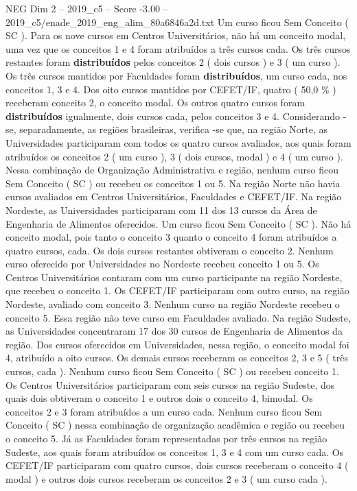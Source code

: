 \begin{textsample}{NEG Dim 2 – 2019\_c5 – Score -3.00 – 2019\_c5/enade\_2019\_eng\_alim\_80a6846a2d.txt}
Um curso ficou Sem Conceito ( SC ).
Para os nove cursos em Centros Universitários, não há um conceito modal, uma vez que os conceitos 1 e 4 foram atribuídos a três cursos cada.
Os três cursos restantes foram \textbf{distribuídos} pelos conceitos 2 ( dois cursos ) e 3 ( um curso ).
Os três cursos mantidos por Faculdades foram \textbf{distribuídos}, um curso cada, nos conceitos 1, 3 e 4.
Dos oito cursos mantidos por CEFET/IF, quatro ( 50,0 \% ) receberam conceito 2, o conceito modal.
Os outros quatro cursos foram \textbf{distribuídos} igualmente, dois cursos cada, pelos conceitos 3 e 4.
Considerando -se, separadamente, as regiões brasileiras, verifica -se que, na região Norte, as Universidades participaram com todos os quatro cursos avaliados, aos quais foram atribuídos os conceitos 2 ( um curso ), 3 ( dois cursos, modal ) e 4 ( um curso ).
Nessa combinação de Organização Administrativa e região, nenhum curso ficou Sem Conceito ( SC ) ou recebeu os conceitos 1 ou 5.
Na região Norte não havia cursos avaliados em Centros Universitários, Faculdades e CEFET/IF.
Na região Nordeste, as Universidades participaram com 11 dos 13 cursos da Área de Engenharia de Alimentos oferecidos.
Um curso ficou Sem Conceito ( SC ).
Não há conceito modal, pois tanto o conceito 3 quanto o conceito 4 foram atribuídos a quatro cursos, cada.
Os dois cursos restantes obtiveram o conceito 2.
Nenhum curso oferecido por Universidades no Nordeste recebeu conceito 1 ou 5.
Os Centros Universitários contaram com um curso participante na região Nordeste, que recebeu o conceito 1.
Os CEFET/IF participaram com outro curso, na região Nordeste, avaliado com conceito 3.
Nenhum curso na região Nordeste recebeu o conceito 5.
Essa região não teve curso em Faculdades avaliado.
Na região Sudeste, as Universidades concentraram 17 dos 30 cursos de Engenharia de Alimentos da região.
Dos cursos oferecidos em Universidades, nessa região, o conceito modal foi 4, atribuído a oito cursos.
Os demais cursos receberam os conceitos 2, 3 e 5 ( três cursos, cada ).
Nenhum curso ficou Sem Conceito ( SC ) ou recebeu conceito 1.
Os Centros Universitários participaram com seis cursos na região Sudeste, dos quais dois obtiveram o conceito 1 e outros dois o conceito 4, bimodal.
Os conceitos 2 e 3 foram atribuídos a um curso cada.
Nenhum curso ficou Sem Conceito ( SC ) nessa combinação de organização acadêmica e região ou recebeu o conceito 5.
Já as Faculdades foram representadas por três cursos na região Sudeste, aos quais foram atribuídos os conceitos 1, 3 e 4 com um curso cada.
Os CEFET/IF participaram com quatro cursos, dois cursos receberam o conceito 4 ( modal ) e outros dois cursos receberam os conceitos 2 e 3 ( um curso cada ).

\end{textsample}
